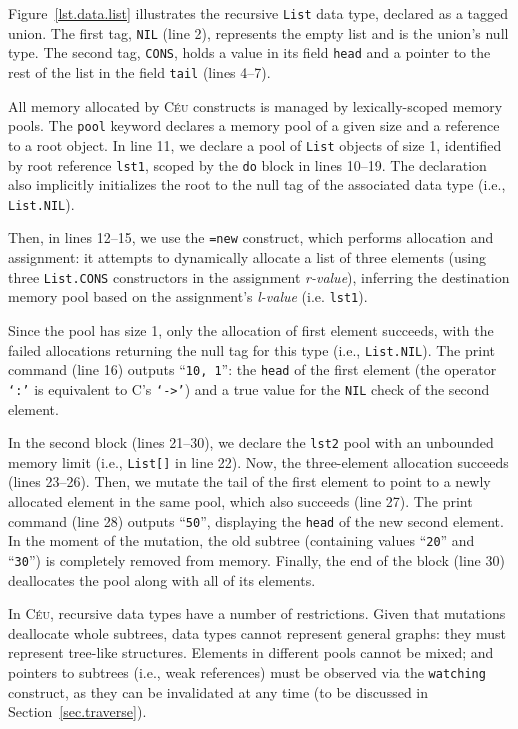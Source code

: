 \documentclass{acm_proc_article-sp}
\newcommand{\CEU}{\textsc{C\'{e}u}\xspace}
\newcommand{\code}[1] {{\small{\texttt{#1}}}}
\begin{document}
Figure~\ref{lst.data.list} illustrates the recursive \code{List} data type,
declared as a tagged union. The first tag, \code{NIL} (line 2), represents
the empty list and is the union's null type. The second tag, \code{CONS},
holds a value in its field \code{head} and a pointer to the rest of the list
in the field \code{tail} (lines 4--7).

All memory allocated by \CEU constructs is managed by lexically-scoped memory
pools. The \code{pool} keyword declares a memory pool of a given size and
a reference to a root object. In line 11, we declare a pool of \code{List}
objects of size 1, identified by root reference \code{lst1},
scoped by the \code{do} block in lines 10--19.
The declaration also implicitly initializes the root to the null tag of the 
associated data type (i.e., \code{List.NIL}).

Then, in lines 12--15, we use the \code{=new} construct, which performs
allocation and assignment: it attempts to dynamically allocate a list of
three elements (using three \code{List.CONS} constructors in the assignment
\emph{r-value}), inferring the destination memory pool based on the 
assignment's \emph{l-value} (i.e. \code{lst1}).

Since the pool has size 1, only the allocation of first element succeeds, with the failed 
allocations returning the null tag for this type (i.e., \code{List.NIL}).
The print command (line 16) outputs ``\texttt{10, 1}'': the \code{head} of the 
first element (the operator \code{`:'} is equivalent to C's \code{`->'}) and 
a true value for the \code{NIL} check of the second element.

In the second block (lines 21--30), we declare the \code{lst2} pool with an
unbounded memory limit (i.e., \code{List[]} in line 22).
Now, the three-element allocation succeeds (lines 23--26).
Then, we mutate the tail of the first element to point to a newly allocated 
element in the same pool, which also succeeds (line 27).
The print command (line 28) outputs ``\texttt{50}'', displaying the \code{head}
of the new second element.
In the moment of the mutation, the old subtree (containing values  ``\texttt{20}''
and  ``\texttt{30}'') is completely removed from memory.
Finally, the end of the block (line 30) deallocates the pool along with all of 
its elements.


In \CEU, recursive data types have a number of restrictions.
Given that mutations deallocate whole subtrees, data types cannot represent 
general graphs: they must represent tree-like structures.
Elements in different pools cannot be mixed;
and pointers to subtrees (i.e., weak references) must be observed via the
\code{watching} construct, as they can be invalidated at any time
(to be discussed in Section~\ref{sec.traverse}).
\end{document}
